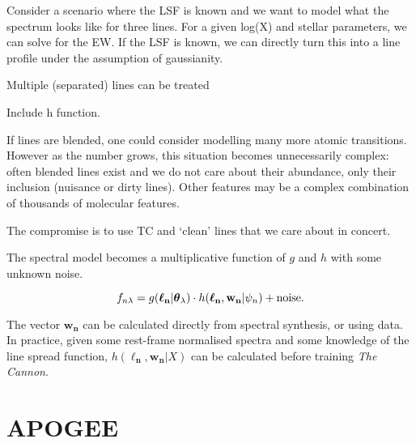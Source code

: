 \documentclass[useAMS,usenatbib]{mn2e}
\newcommand\tc{\textit{The Cannon}}
\newcommand\lv{\mathbf{\boldsymbol\ell_n}}
\newcommand\cv{{\boldsymbol\theta}_\lambda}
\newcommand\wv{\mathbf{w_n}}
\newcommand\given{|}
\begin{document}

Consider a scenario where the LSF is known and we want to model what the
spectrum looks like for three lines. For a given log(X) and stellar parameters,
we can solve for the EW. If the LSF is known, we can directly turn this into a
line profile under the assumption of gaussianity.

Multiple (separated) lines can be treated

Include h function.

If lines are blended, one could consider modelling many more atomic transitions.
However as the number grows, this situation becomes unnecessarily complex:
often blended lines exist and we do not care about their abundance, only their
inclusion (nuisance or dirty lines). Other features may be a complex combination
of thousands of molecular features.

The compromise is to use TC and `clean' lines that we care about in concert.

The spectral model becomes a multiplicative function of $g$ and $h$ with some
unknown noise.

\begin{equation}
    f_{n\lambda} = g(\lv\given\cv) \cdot h(\lv,\wv\given\psi_n) +  {\rm noise}.
\end{equation}

The vector $\wv$ can be calculated directly from spectral synthesis, or using data.
In practice, given some rest-frame normalised spectra and some knowledge of the
line spread function, $h(\lv,\wv\given{}X)$ can be calculated before training \tc.







\section{APOGEE}

\end{document}
